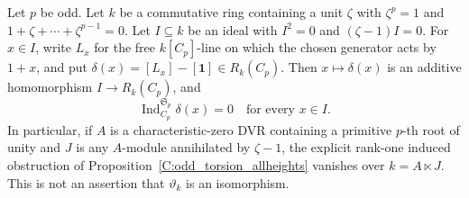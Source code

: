 \begin{proposition}
\label{C:cyclotomic_torsion_cancellation}
Let $p$ be odd. Let $k$ be a commutative ring containing a unit
$\zeta$ with $\zeta^p=1$ and $1+\zeta+\cdots+\zeta^{p-1}=0$.
Let $I\subseteq k$ be an ideal with $I^2=0$ and
$(\zeta-1)I=0$. For $x\in I$, write $L_x$ for the free
$k[C_p]$-line on which the chosen generator acts by $1+x$, and put
$\delta(x)=[L_x]-[\mathbf1]\in R_k(C_p)$.
Then $x\mapsto\delta(x)$ is an additive homomorphism
$I\to R_k(C_p)$, and
\[
 \operatorname{Ind}_{C_p}^{\mathfrak S_p}\delta(x)=0
 \quad\text{for every }x\in I.
\]
In particular, if $A$ is a characteristic-zero DVR containing a
primitive $p$-th root of unity and $J$ is any $A$-module annihilated
by $\zeta-1$, the explicit rank-one induced obstruction of
Proposition~\ref{C:odd_torsion_allheights} vanishes over
$k=A\ltimes J$. This is not an assertion that $\vartheta_k$ is an
isomorphism.
\end{proposition}
